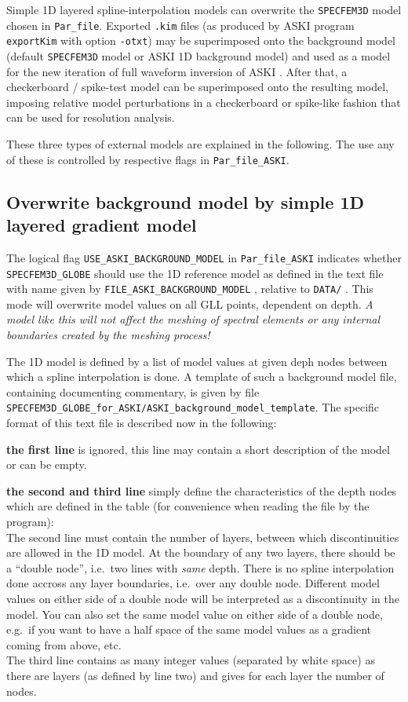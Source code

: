 \documentclass[12pt,a4paper]{article}
\newcommand{\lcode}[1]{\nolinkurl{#1}}
\newcommand{\ASKI}{ {\ttfamily ASKI} }
\begin{document}
Simple 1D layered spline-interpolation models can overwrite the \lcode{SPECFEM3D} model chosen in
\lcode{Par_file}.
Exported \lcode{.kim} files (as produced by \ASKI program \lcode{exportKim} with option \lcode{-otxt}) may be 
superimposed onto the background model (default \lcode{SPECFEM3D} model or \ASKI 1D background model) 
and used as a model for the new iteration of full waveform inversion of \ASKI. 
After that, a checkerboard / spike-test model can be superimposed onto the resulting model, imposing relative
model perturbations in a checkerboard or spike-like fashion that can be used for resolution analysis.

These three types of external models are explained in the following. The use any of these is controlled by
respective flags in \lcode{Par_file_ASKI}.

\subsection{Overwrite background model by simple 1D layered gradient model} \label{import_model:ssec_1D}
The logical flag \lcode{USE_ASKI_BACKGROUND_MODEL} in \lcode{Par_file_ASKI} indicates whether 
\lcode{SPECFEM3D_GLOBE} should use the 1D reference model as defined in the text file with name given by 
\lcode{FILE_ASKI_BACKGROUND_MODEL} , relative to \lcode{DATA/} .
This mode will overwrite model values on all GLL points, dependent on depth. 
\emph{A model like this will not affect the meshing of spectral elements or any internal boundaries created
by the meshing process!}

The 1D model is defined by a list of model values at given deph nodes between which a spline interpolation 
is done. 
A template of such a background model file, containing documenting commentary, is given by file 
\lcode{SPECFEM3D_GLOBE_for_ASKI/ASKI_background_model_template}.
The specific format of this text file is described now in the following:

{\bf the first line} is ignored, this line may contain a short description of the model or can be empty.

{\bf the second and third line} simply define the characteristics of the depth nodes which are defined 
in the table (for convenience when reading the file by the program):\\
The second line must contain the number of layers, between which discontinuities are allowed in the 1D model. 
At the boundary of any two layers, there should be a ``double node'', i.e.\ two lines with \emph{same} depth. 
There is no spline interpolation done accross any layer boundaries, i.e.\ over any double node. 
Different model values on either side of a double node will be interpreted as a discontinuity in the model. 
You can also set the same model value on either side of a double node, e.g.\ if you want to have a half space
of the same model values as a gradient coming from above, etc.\\
The third line contains as many integer values (separated by white space) as there are layers 
(as defined by line two) and gives for each layer the number of nodes. 
\end{document}
